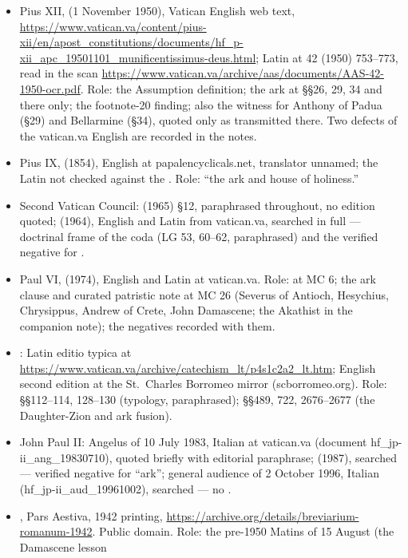 \begin{itemize}
\item Pius XII,  (1 November 1950), Vatican
English web text,
\url{https://www.vatican.va/content/pius-xii/en/apost_constitutions/documents/hf_p-xii_apc_19501101_munificentissimus-deus.html};
Latin at  42 (1950) 753--773, read in the scan
\url{https://www.vatican.va/archive/aas/documents/AAS-42-1950-ocr.pdf}.
Role: the Assumption definition; the ark at \S\S 26, 29, 34 and there
only; the footnote-20 finding; also the witness for Anthony of Padua
(\S 29) and Bellarmine (\S 34), quoted only as transmitted there. Two
defects of the vatican.va English are recorded in the notes.
\item Pius IX,  (1854), English at
papalencyclicals.net, translator unnamed; the Latin not checked against
the . Role: ``the ark and house of holiness.''
\item Second Vatican Council:  (1965) \S 12,
paraphrased throughout, no edition quoted;  (1964),
English and Latin from vatican.va, searched in full --- doctrinal frame
of the coda (LG 53, 60--62, paraphrased) and the verified negative for
.
\item Paul VI,  (1974), English and Latin at
vatican.va. Role:  at MC 6; the ark clause and
curated patristic note at MC 26 (Severus of Antioch, Hesychius,
Chrysippus, Andrew of Crete, John Damascene; the Akathist in the
companion note); the negatives recorded with them.
\item {}: Latin editio typica at
\url{https://www.vatican.va/archive/catechism_lt/p4s1c2a2_lt.htm};
English second edition at the St.~Charles Borromeo mirror
(scborromeo.org). Role: \S\S 112--114, 128--130 (typology, paraphrased);
\S\S 489, 722, 2676--2677 (the Daughter-Zion and ark fusion).
\item John Paul II: Angelus of 10 July 1983, Italian at vatican.va
(document hf\_jp-ii\_ang\_19830710), quoted briefly with editorial
paraphrase;  (1987), searched --- verified
negative for ``ark''; general audience of 2 October 1996, Italian
(hf\_jp-ii\_aud\_19961002), searched --- no .
\item {}, Pars Aestiva, 1942 printing,
\url{https://archive.org/details/breviarium-romanum-1942}. Public
domain. Role: the pre-1950 Matins of 15 August (the Damascene lesson

\end{itemize}
